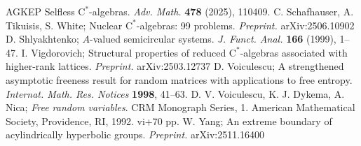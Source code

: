 \documentclass[12pt,nosumlimits,nonamelimits]{amsart}
\theoremstyle{remark}
\theoremstyle{definition}
\begin{document}
\begin{thebibliography}{AGKEP}
Selfless $\mathrm{C}^*$-alge\-bras. 
\emph{Adv. Math.} \textbf{478} (2025), 110409.
%
 C. Schafhauser, A. Tikuisis, S. White;
Nuclear $\mathrm{C}^*$-alge\-bras: 99 problems.
\emph{Preprint.} arXiv:2506.10902
%
 D. Shlyakhtenko; 
$A$-valued semicircular systems. 
\emph{J. Funct. Anal.} \textbf{166} (1999), 1--47.
%
 I. Vigdorovich;
Structural properties of reduced $\mathrm{C}^*$-alge\-bras associated with higher-rank lattices.
\emph{Preprint.} arXiv:2503.12737
%
 D. Voiculescu; 
A strengthened asymptotic freeness result for random matrices 
with applications to free entropy. 
\emph{Internat. Math. Res. Notices} \textbf{1998}, 41--63.
%
 D. V. Voiculescu, K. J. Dykema, A. Nica; 
\emph{Free random variables}. 
CRM Monograph Series, 1. American Mathematical Society, Providence, RI, 1992. vi+70 pp. 
%
 W. Yang;
An extreme boundary of acylindrically hyperbolic groups.
\emph{Preprint.} arXiv:2511.16400
%
\end{thebibliography}
\end{document}
